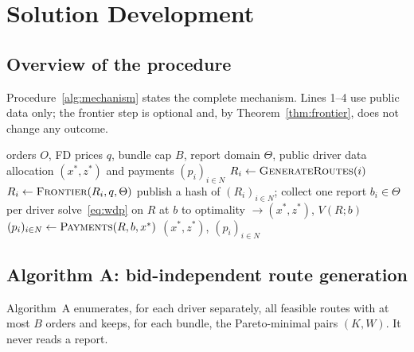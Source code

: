 \section{Solution Development}
\label{sec:development}

\subsection{Overview of the procedure}

Procedure~\ref{alg:mechanism} states the complete mechanism. Lines 1--4 use
public data only; the frontier step is optional and, by
Theorem~\ref{thm:frontier}, does not change any outcome.

\begin{algorithm}[!htbp]
\caption{Truthful route-bundle procurement}
\label{alg:mechanism}
\begin{algorithmic}[1]
\Require orders $O$, FD prices $q$, bundle cap $B$, report domain $\Theta$, public driver data
\Ensure allocation $(x^\ast,z^\ast)$ and payments $(p_i)_{i\in N}$
 
  \State $R_i\gets\textsc{GenerateRoutes}(i)$ 
  \State $R_i\gets\textsc{Frontier}(R_i,q,\Theta)$ 
\EndFor
\State publish a hash of $(R_i)_{i\in N}$; collect one report $b_i\in\Theta$ per driver
\State solve~\eqref{eq:wdp} on $R$ at $b$ to optimality $\to(x^\ast,z^\ast)$, $V(R;b)$ 
\State $(p_i)_{i\in N}\gets\textsc{Payments}(R,b,x^\ast)$ 
\State \Return $(x^\ast,z^\ast)$, $(p_i)_{i\in N}$
\end{algorithmic}
\end{algorithm}

\subsection{Algorithm A: bid-independent route generation}
\label{sec:sd-algA}

Algorithm~A enumerates, for each driver separately, all feasible routes
with at most $B$ orders and keeps, for each bundle, the Pareto-minimal
pairs $(K,W)$. It never reads a report.

